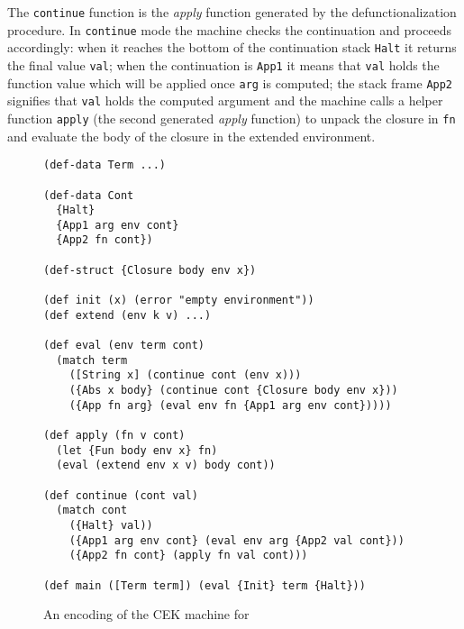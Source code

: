 The \lstinline!continue! function is the \textit{apply} function generated by the defunctionalization procedure.
In \lstinline!continue! mode the machine checks the continuation and proceeds accordingly: when it reaches the bottom of the continuation stack \lstinline!Halt! it returns the final value \lstinline!val!; when the continuation is \lstinline!App1! it means that \lstinline!val! holds the function value which will be applied once \lstinline!arg! is computed; the stack frame \lstinline!App2! signifies that \lstinline!val! holds the computed argument and the machine calls a helper function \lstinline!apply! (the second generated \textit{apply} function) to unpack the closure in \lstinline!fn! and evaluate the body of the closure in the extended environment. 

\begin{figure}[hb]
\begin{lstlisting}
(def-data Term ...)

(def-data Cont
  {Halt}
  {App1 arg env cont}
  {App2 fn cont})

(def-struct {Closure body env x})

(def init (x) (error "empty environment"))
(def extend (env k v) ...)

(def eval (env term cont)
  (match term
    ([String x] (continue cont (env x)))
    ({Abs x body} (continue cont {Closure body env x}))
    ({App fn arg} (eval env fn {App1 arg env cont}))))

(def apply (fn v cont)
  (let {Fun body env x} fn)
  (eval (extend env x v) body cont))

(def continue (cont val)
  (match cont
    ({Halt} val))
    ({App1 arg env cont} (eval env arg {App2 val cont}))
    ({App2 fn cont} (apply fn val cont)))

(def main ([Term term]) (eval {Init} term {Halt}))
\end{lstlisting}
\caption{An encoding of the CEK machine for \LC{}}
\label{fig:abstract-machine-cek}
\end{figure}
